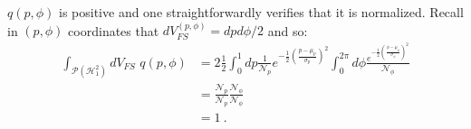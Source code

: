 \documentclass[draft,nofootinbib,pre,twocolumn,showkeys,superscriptaddress,preprintnumbers,floatfix]{revtex4-1}
\newcommand{\1}{\mathbbm{1}}
\begin{document}
\begin{widetext}
$q(p,\phi)$ is positive and one straightforwardly verifies that it is
normalized. Recall in $(p,\phi)$ coordinates that $dV_{FS}^{(p,\phi)} =
dpd\phi / 2$ and so:
\begin{align*}
\int_{\mathcal{P}(\mathcal{H}_1^2)} \!\!\!\!\!\!\!\!\!\! dV_{FS} \,\, q(p,\phi)
& = 2 \frac{1}{2} \int_{0}^1 dp \frac{1}{\mathcal{N}_p}
e^{-\frac{1}{2}\left(\frac{p-\mu_p}{\sigma_p}\right)^2} \int_0^{2\pi}d\phi
\frac{
e^{-\frac{1}{2}\left(\frac{\phi-\mu_\phi}{\sigma_\phi}\right)^2}}{\mathcal{N}_\phi}
\\
  & = \frac{\mathcal{N}_p}{\mathcal{N}_p}
  \frac{\mathcal{N}_\phi}{\mathcal{N}_\phi} \\
  & = 1
  ~.
\end{align*}
\end{widetext}


\end{document}
